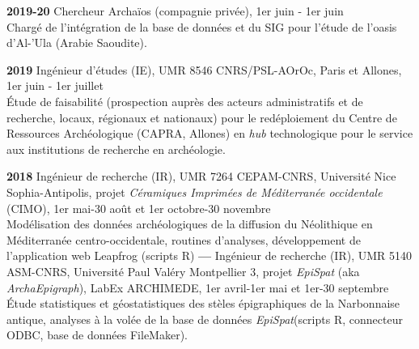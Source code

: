 \documentclass{article}
\newcommand{\fr}[1]{#1}       %
\newcommand{\en}[1]{}     %
\begin{document}
\smallbreak
\textbf{2019-20} 
\fr{Chercheur Archaïos (compagnie privée), 1er juin - 1er juin \\
\hspace*{0.5cm} Chargé de l'intégration de la base de données et du SIG pour l'étude de l'oasis d'Al-'Ula (Arabie Saoudite).}
\en{Researcher at Archaïos (private company), June 1 - June 1 \\
\hspace*{0.5cm} Responsible for the integration of the database and GIS for the study of Al-'Ula oasis (Saudi Arabia).}
\smallbreak
\textbf{2019} 
\fr{Ingénieur d'études (IE), UMR 8546 CNRS/PSL-AOrOc, Paris et Allones, 1er juin - 1er juillet \\ 
\hspace*{0.5cm} Étude de faisabilité (prospection auprès des acteurs administratifs et de recherche, locaux, régionaux et nationaux) pour le redéploiement du Centre de Ressources Archéologique (CAPRA, Allones) en \textit{hub} technologique pour le service aux institutions de recherche en archéologie.}
\en{Study Engineer (IE), UMR 8546 CNRS/PSL-AOrOc, Paris and Allones, June 1 - July 1 \\ 
\hspace*{0.5cm} Feasibility study (outreach to local, regional, and national administrative and research stakeholders) for the redeployment of the Archaeological Resource Center (CAPRA, Allones) into a technological hub for service to archaeological research institutions.}
\smallbreak
\textbf{2018} \fr{Ingénieur de recherche (IR), UMR 7264 CEPAM-CNRS, Université Nice Sophia-Antipolis, projet \textit{Céramiques Imprimées de Méditerranée occidentale} (CIMO), 1er mai-30 août et 1er octobre-30 novembre} \en{Research Engineer, UMR 7264 CEPAM-CNRS, University of Nice Sophia-Antipolis, project \textit{Printed Ceramics of the Western Mediterranean} (CIMO), May 1-August 30 and October 1-November 30} \\
\hspace*{0.5cm} \fr{Modélisation des données archéologiques de la diffusion du Néolithique en Méditerranée centro-occidentale, routines d'analyses, développement de l'application web Leapfrog (scripts R)} \en{Modeling archaeological data on the spread of the Neolithic in the central-western Mediterranean, analysis routines, development of the Leapfrog web application (R scripts)}
\smallbreak
\textbf{--- } \fr{Ingénieur de recherche (IR), UMR 5140 ASM-CNRS, Université Paul Valéry Montpellier 3, projet \textit{EpiSpat} (aka \textit{ArchaEpigraph}), LabEx ARCHIMEDE, 1er avril-1er mai et 1er-30 septembre} \en{Research Engineer, UMR 5140 ASM-CNRS, Paul Valéry University Montpellier 3, project \textit{EpiSpat} (also known as \textit{ArchaEpigraph}), LabEx ARCHIMEDE, April 1-May 1 and September 1-30} \\
\hspace*{0.5cm} \fr{Étude statistiques et géostatistiques des stèles épigraphiques de la Narbonnaise antique, analyses à la volée de la base de données \textit{EpiSpat}(scripts R, connecteur ODBC, base de données FileMaker).} \en{Statistical and geostatistical studies of epigraphic steles from ancient Narbonnaise, on-the-fly analysis of the \textit{EpiSpat} database (R scripts, ODBC connector, FileMaker database).}
\end{document}
